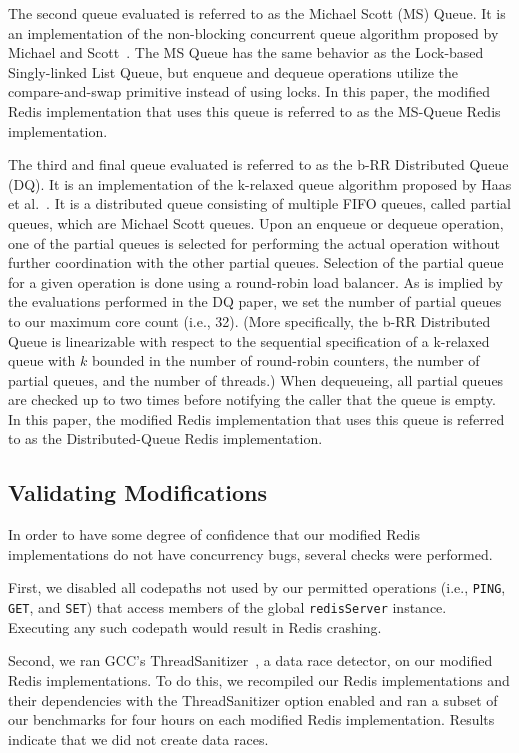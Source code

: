 \documentclass[sigconf, screen]{acmart}
\newcommand{\inlinecode}[1]{\texttt{#1}}
\begin{document}
The second queue evaluated is referred to as the Michael Scott (MS) Queue.
It is an implementation of the non-blocking concurrent queue algorithm proposed by Michael and Scott~\cite{michael_scott}.
The MS Queue has the same behavior as the Lock-based Singly-linked List Queue, but enqueue and dequeue operations utilize the compare-and-swap primitive instead of using locks.
In this paper, the modified Redis implementation that uses this queue is referred to as the MS-Queue Redis implementation.

The third and final queue evaluated is referred to as the b-RR Distributed Queue (DQ).
It is an implementation of the k-relaxed queue algorithm proposed by Haas et al.~\cite{b-RR_Distributed_Queue}.
It is a distributed queue consisting of multiple FIFO queues, called partial queues, which are Michael Scott queues.
Upon an enqueue or dequeue operation, one of the partial queues is selected for performing the actual operation without further coordination with the other partial queues.
Selection of the partial queue for a given operation is done using a round-robin load balancer.
As is implied by the evaluations performed in the DQ paper, we set the number of partial queues to our maximum core count (i.e., 32).
(More specifically, the b-RR Distributed Queue is linearizable with respect to the sequential specification of a k-relaxed queue with $k$ bounded in the number of  round-robin  counters, the number of  partial queues, and the number of threads.)
When dequeueing, all partial queues are checked up to two times before notifying the caller that the queue is empty.
In this paper, the modified Redis implementation that uses this queue is referred to as the Distributed-Queue Redis implementation.


\subsection{Validating Modifications}
In order to have some degree of confidence that our modified Redis implementations do not have concurrency bugs, several checks were performed.

First, we disabled all codepaths not used by our permitted operations (i.e., \inlinecode{PING}, \inlinecode{GET}, and \inlinecode{SET}) that access members of the global \inlinecode{redisServer} instance.
Executing any such codepath would result in Redis crashing.

Second, we ran GCC's ThreadSanitizer~\cite{thread-sanitizer}, a data race detector, on our modified Redis implementations.
To do this, we recompiled our Redis implementations and their dependencies with the ThreadSanitizer option enabled and ran a subset of our benchmarks for four hours on each modified Redis implementation.
Results indicate that we did not create data races.
\end{document}
